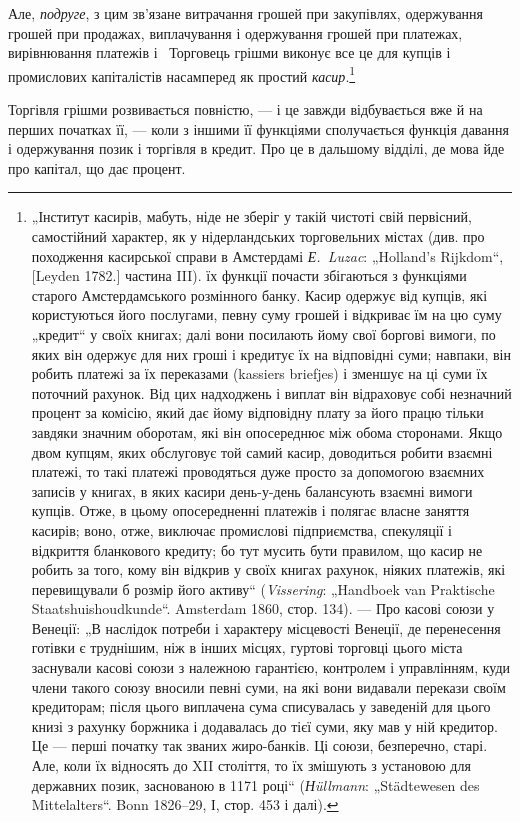 Але, \emph{подруге}, з цим зв’язане витрачання грошей при закупівлях,
одержування грошей при продажах, виплачування і одержування
грошей при платежах, вирівнювання платежів і~
Торговець грішми виконує все це для купців і промислових
капіталістів насамперед як простий \emph{касир}.\footnote{
„Інститут касирів, мабуть, ніде не зберіг у такій чистоті свій первісний,
самостійний характер, як у нідерландських торговельних містах (див. про
походження касирської справи в Амстердамі \emph{Е.~Luzac}: „Holland’s Rijkdom“,
[Leyden 1782.] частина III). їх функції почасти збігаються з функціями старого
Амстердамського розмінного банку. Касир одержує від купців, які користуються
його послугами, певну суму грошей і відкриває їм на цю суму „кредит“
у своїх книгах; далі вони посилають йому свої боргові вимоги, по яких він
одержує для них гроші і кредитує їх на відповідні суми; навпаки, він робить
платежі за їх переказами (kassiers briefjes) і зменшує на ці суми їх поточний
рахунок. Від цих надходжень і виплат він відраховує собі незначний процент
за комісію, який дає йому відповідну плату за його працю тільки завдяки
значним оборотам, які він опосереднює між обома сторонами. Якщо двом купцям,
яких обслуговує той самий касир, доводиться робити взаємні платежі, то
такі платежі проводяться дуже просто за допомогою взаємних записів у книгах,
в яких касири день-у-день балансують взаємні вимоги купців. Отже, в цьому
опосередненні платежів і полягає власне заняття касирів; воно, отже, виключає
промислові підприємства, спекуляції і відкриття бланкового кредиту; бо тут
мусить бути правилом, що касир не робить за того, кому він відкрив у своїх
книгах рахунок, ніяких платежів, які перевищували б розмір його активу“
(\emph{Vissering}: „Handboek van Praktische Staatshuishoudkunde“. Amsterdam 1860,
стор. 134). — Про касові союзи у Венеції: „В наслідок потреби і характеру
місцевості Венеції, де перенесення готівки є труднішим, ніж в інших місцях,
гуртові торговці цього міста заснували касові союзи з належною гарантією,
контролем і управлінням, куди члени такого союзу вносили певні суми, на
які вони видавали перекази своїм кредиторам; після цього виплачена сума
списувалась у заведеній для цього книзі з рахунку боржника і додавалась до
тієї суми, яку мав у ній кредитор. Це — перші початку так званих жиро-банків.
Ці союзи, безперечно, старі. Але, коли їх відносять до XII століття, то їх
змішують з установою для державних позик, заснованою в 1171 році“ (\emph{Нüllmann}:
„Städtewesen des Mittelalters“. Bonn 1826--29, І, стор. 453 і далі).
}

Торгівля грішми розвивається повністю, — і це завжди відбувається
вже й на перших початках її, — коли з іншими її функціями
сполучається функція давання і одержування позик і торгівля
в кредит. Про це в дальшому відділі, де мова йде про капітал,
що дає процент.
